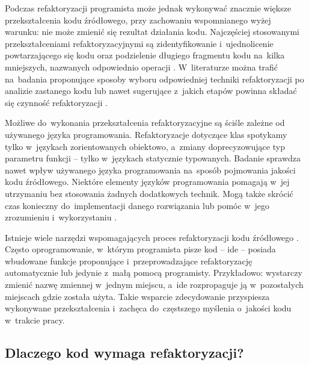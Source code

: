 \documentclass[twoside]{praca}
\begin{document}
Podczas refaktoryzacji programista może jednak wykonywać znacznie większe przekształcenia kodu źródłowego, przy zachowaniu wspomnianego wyżej warunku: nie może zmienić się rezultat działania kodu. Najczęściej stosowanymi przekształceniami refaktoryzacyjnymi są zidentyfikowanie i~ujednolicenie powtarzającego się kodu oraz podzielenie długiego fragmentu kodu na~kilka mniejszych, nazwanych odpowiednio operacji \cite{silva2016we}. W~literaturze można trafić na~badania proponujące sposoby wyboru odpowiedniej techniki refaktoryzacji po analizie zastanego kodu \cite{meananeatra2011using} lub nawet sugerujące z~jakich etapów powinna składać się czynność refaktoryzacji \cite{meananeatra2012identifying}.

Możliwe do~wykonania przekształcenia refaktoryzacyjne są ściśle zależne od używanego języka programowania. Refaktoryzacje dotyczące klas spotykamy tylko w~językach zorientowanych obiektowo, a~zmiany doprecyzowujące typ parametru funkcji -- tylko w~językach statycznie typowanych. Badanie \cite{ray2014large} sprawdza nawet wpływ używanego języka programowania na~sposób pojmowania jakości kodu źródłowego. Niektóre elementy języków programowania pomagają w~jej utrzymaniu bez stosowania żadnych dodatkowych technik. Mogą także skrócić czas konieczny do~implementacji danego rozwiązania \cite{hanenberg2010experiment} lub pomóc w~jego zrozumieniu i~wykorzystaniu \cite{endrikat2014api}. 

Istnieje wiele narzędzi wspomagających proces refaktoryzacji kodu źródłowego \cite{murphy2012we}. Często oprogramowanie, w~którym programista pisze kod -- \gls{ide} -- posiada wbudowane funkcje proponujące i~przeprowadzające refaktoryzację automatycznie lub jedynie z~małą pomocą programisty. Przykładowo: wystarczy zmienić nazwę zmiennej w~jednym miejscu, a~\gls{ide} rozpropaguje ją w~pozostałych miejscach gdzie została użyta. Takie wsparcie zdecydowanie przyspiesza wykonywane przekształcenia i~zachęca do~częstszego myślenia o~jakości kodu w~trakcie pracy.

\subsection{Dlaczego kod wymaga refaktoryzacji?}
\end{document}
